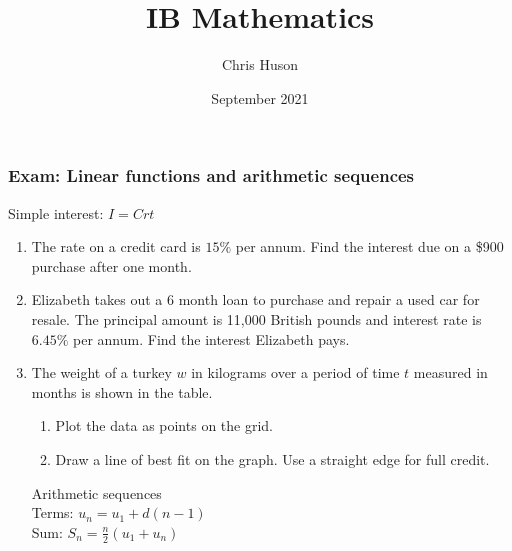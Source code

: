 \documentclass[12pt, twoside]{article}
\title{IB Mathematics}
\author{Chris Huson}
\date{September 2021}
\begin{document}
\subsubsection*{Exam: Linear functions and arithmetic sequences}
Simple interest: $I=Crt$
\begin{enumerate}

\item The rate on a credit card is $15\%$ per annum. Find the interest due on a \$900 purchase after one month. \vspace{3cm}

\item Elizabeth takes out a 6 month loan to purchase and repair a used car for resale. The principal amount is 11,000 British pounds and interest rate is $6.45\%$ per annum. Find the interest Elizabeth pays.
\vspace{4cm}

\item The weight of a turkey $w$ in kilograms over a period of time $t$ measured in months is shown in the table.
\begin{enumerate}
  \item Plot the data as points on the grid.
  \item Draw a line of best fit on the graph. Use a straight edge for full credit.
\end{enumerate}
  \begin{center} 
  \end{center}

\newpage
Arithmetic sequences\\[0.25cm]
Terms: $u_n=u_1 + d(n-1)$\\[0.25cm]
Sum: $\displaystyle S_n= \frac{n}{2}(u_1 + u_n)$\\[0.25cm]



\end{enumerate}
\end{document}
